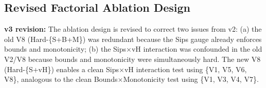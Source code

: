 \documentclass[12pt,a4paper]{article}
\begin{document}
\subsection{Revised Factorial Ablation Design}

\begin{changebox}
\textbf{v3 revision:} The ablation design is revised to correct two issues
from v2: (a) the old V8 (Hard-\{S+B+M\}) was redundant because the Sips
gauge already enforces bounds and monotonicity; (b) the Sips$\times$vH
interaction was confounded in the old V2/V8 because bounds and monotonicity
were simultaneously hard. The new V8 (Hard-\{S+vH\}) enables a clean
Sips$\times$vH interaction test using \{V1, V5, V6, V8\}, analogous to
the clean Bounds$\times$Monotonicity test using \{V1, V3, V4, V7\}.
\end{changebox}
\end{document}
